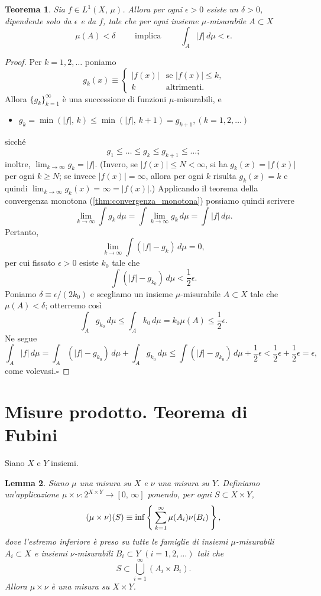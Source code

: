 \documentclass[a4paper,10pt,openright,oneside]{book}
\theoremstyle{theoremstyle}
\newtheorem{teorema}{Teorema}[section]
\newtheorem{lemma}[teorema]{Lemma}
\theoremstyle{theoremstylewoheader}
\theoremstyle{theoremstyle}
\theoremstyle{proofsecstyle}
\theoremstyle{nonumberplain}
\newtheorem{proof}{Dim.}
\newcommand{\abs}[1]{\ensuremath{\lvert #1 \rvert}}
\renewcommand{\qedsymbol}{\ensuremath{\square}}
\newcommand{\qed}{\unskip\nobreak\hfill\nobreak\hspace{.5em}\qedsymbol}
\newcommand{\mymath}[2]{\begin{itemize}%
  \item[]\hfill\hbox{}\ensuremath{\displaystyle #1}\hfill\ensuremath{\displaystyle #2}%
  \end{itemize}}
\begin{document}
\begin{teorema}
\label{thm:assoluta_continuita_integrale}
Sia $f \in L^1(X,\, \mu)$. Allora per ogni $\epsilon > 0$ esiste un $\delta > 0$, dipendente solo da $\epsilon$ e da $f$, tale che per ogni insieme $\mu$-misurabile $A \subset X$
\[
\mu(A) < \delta \qquad\text{ implica }\qquad \int_A \abs{f}\, d\mu < \epsilon.
\]
\end{teorema}

\begin{proof}
Per $k = 1, 2, \ldots$ poniamo
\[
g_k(x) \equiv \begin{cases}
\abs{f(x)} & \text{se $\abs{f(x)} \le k$,}\\
k & \text{altrimenti.}\end{cases}
\]
Allora $\{g_k\}_{k=1}^\infty$ è una successione di funzioni $\mu$-misurabili, e \mymath{g_k = \min(\abs{f},\, k) \le \min(\abs{f},\, k+1) = g_{k+1},}{(k = 1, 2, \ldots)} sicché
\[
g_1 \le \ldots \le g_k \le g_{k+1} \le \ldots;
\]
inoltre, $\lim_{k \to \infty} g_k = \abs{f}$. (Invero, se $\abs{f(x)} \le N < \infty$, si ha $g_k(x) = \abs{f(x)}$ per ogni $k \ge N$; se invece $\abs{f(x)} = \infty$, allora per ogni $k$ risulta $g_k(x) = k$ e quindi $\lim_{k \to \infty} g_k(x) = \infty = \abs{f(x)}$.) Applicando il teorema della convergenza monotona (\ref{thm:convergenza_monotona}) possiamo quindi scrivere
\[
\lim_{k \to \infty} \int g_k\, d\mu = \int \lim_{k \to \infty} g_k\, d\mu = \int \abs{f}\, d\mu. 
\]
Pertanto,
\[
\lim_{k \to \infty} \int (\abs{f} - g_k)\, d\mu = 0,
\]
per cui fissato $\epsilon > 0$ esiste $k_0$ tale che
\[
\int (\abs{f} - g_{k_0})\, d\mu < \frac{1}{2} \epsilon.
\]
Poniamo $\delta \equiv \epsilon/(2k_0)$ e scegliamo un insieme $\mu$-misurabile $A \subset X$ tale che $\mu(A) < \delta$; otterremo così
\[
\int_A g_{k_0}\, d\mu \le \int_A k_0\, d\mu = k_0\mu(A) \le \frac{1}{2}\epsilon.
\]
Ne segue
\[
\int_A \abs{f}\, d\mu = \int_A (\abs{f} - g_{k_0})\, d\mu + \int_A g_{k_0}\, d\mu \le \int (\abs{f} - g_{k_0})\, d\mu + \frac{1}{2}\epsilon < \frac{1}{2}\epsilon + \frac{1}{2}\epsilon = \epsilon,
\]
come volevasi.\qed
\end{proof}

\section{Misure prodotto. Teorema di Fubini}

Siano $X$ e $Y$ insiemi.

\begin{lemma}
Siano $\mu$ una misura su $X$ e $\nu$ una misura su $Y$. Definiamo un'applicazione $\mu \times \nu : 2^{X \times Y} \rightarrow [0,\, \infty]$ ponendo, per ogni $S \subset X \times Y$,
\[
(\mu \times \nu) (S) \equiv \inf \Set {\sum_{k=1}^\infty \mu(A_i)\nu(B_i)} ,
\]
dove l'estremo inferiore è preso su tutte le famiglie di insiemi $\mu$-misurabili $A_i \subset X$ e insiemi $\nu$-misurabili $B_i \subset Y$ $(i = 1, 2, \ldots)$ tali che
\[
S \subset \bigcup_{i=1}^\infty (A_i \times B_i).
\]
Allora $\mu\times\nu$ è una misura su $X \times Y$.
\end{lemma}
\end{document}
